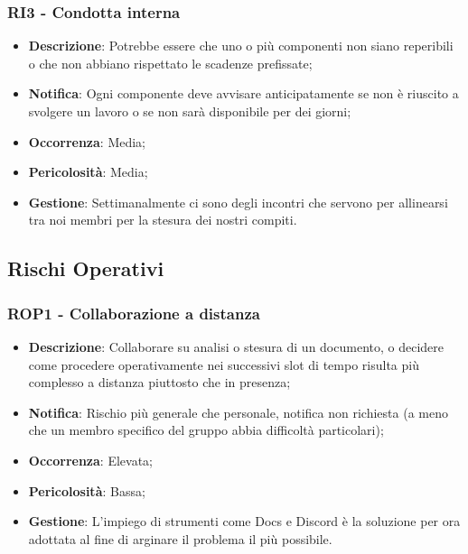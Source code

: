 	\subsubsection*{RI3 - Condotta interna}
	\begin{itemize}
		\item \textbf{Descrizione}: Potrebbe essere che uno o più componenti non siano reperibili o che non abbiano rispettato le scadenze prefissate;
		\item \textbf{Notifica}: Ogni componente deve avvisare anticipatamente se non è riuscito a svolgere un lavoro o se non sarà disponibile per dei giorni;
		\item \textbf{Occorrenza}: Media;
		\item \textbf{Pericolosità}: Media;
		\item \textbf{Gestione}: Settimanalmente ci sono degli incontri che servono per allinearsi tra noi membri per la stesura dei nostri compiti.
	\end{itemize}

   \subsection{Rischi Operativi}
  
  	\subsubsection*{ROP1 - Collaborazione a distanza}
  	\begin{itemize}
  		\item \textbf{Descrizione}: Collaborare su analisi o stesura di un documento, o decidere come procedere operativamente nei successivi slot di tempo risulta più complesso a distanza piuttosto che in presenza;
  		\item \textbf{Notifica}: Rischio più generale che personale, notifica non richiesta (a meno che un membro specifico del gruppo abbia difficoltà particolari);
  		\item \textbf{Occorrenza}: Elevata;
  		\item \textbf{Pericolosità}: Bassa;
  		\item \textbf{Gestione}: L'impiego di strumenti come Docs e Discord è la soluzione per ora adottata al fine di arginare il problema il più possibile.
  	\end{itemize}